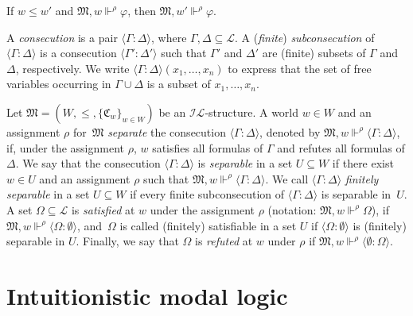 \documentclass[submission,copyright,creativecommons]{eptcs}
\newcommand{\mo}{\mathfrak}
\renewcommand{\phi}{\varphi}
\newcommand{\IL}{\mathscr{I\!\!L}}   %
\newcommand{\LL}{\mathcal{L}}        %
\newcommand{\consec}[2]{\langle #1:#2 \rangle}
\newcommand{\satisfySym}{\Vdash}
\newcommand{\satisfy}[4]{#1, #2 \satisfySym^{#4} #3}
\begin{document}
\begin{lemma}\label{mon.ifol}
  If $w \leq w'$ and $\satisfy{\mo{M}}{w}{\phi}{\rho}$, then $\satisfy{\mo{M}}{w'}{\phi}{\rho}$.
\end{lemma}

\begin{definition}
  A \emph{consecution} is a pair $\consec{\Gamma}{\Delta}$, where $\Gamma,\Delta\subseteq \LL$.
  A (\emph{finite}) \emph{subconsecution} of $\consec{\Gamma}{\Delta}$
  is a consecution $\consec{\Gamma'}{\Delta'}$ such that $\Gamma'$ and $\Delta'$
  are (finite) subsets of $\Gamma$ and $\Delta$, respectively. We write $\consec{\Gamma}{\Delta}(x_1,\ldots,x_n)$ to express that the set of free variables occurring in $\Gamma\cup \Delta$ is a subset of $x_1,\ldots,x_n$.
\end{definition}

\begin{definition}\label{def:separation-refutation}
  Let $\mo{M} = (W, \leq, \{ \mo{C}_w \}_{w \in W})$ be an $\IL$-structure.
 A world $w\in W$ and an assignment $\rho$ for~$\mo{M}$ \emph{separate} the consecution $\consec{\Gamma}{\Delta}$,
  denoted by $\satisfy{\mo{M}}{w}{\consec{\Gamma}{\Delta}}{\rho}$,
  if, under the assignment $\rho$, $w$ satisfies all formulas of $\Gamma$ and refutes all formulas of $\Delta$.
%
  We say that the consecution $\consec{\Gamma}{\Delta}$ is \emph{separable}
  in a set $U \subseteq W$ if there exist $w \in U$ and an assignment
  $\rho$ such that $\satisfy{\mo{M}}{w}{\consec{\Gamma}{\Delta}}{\rho}$.
  We call $\consec{\Gamma}{\Delta}$
  \emph{finitely separable} in a set $U \subseteq W$ if every finite
  subconsecution of $\consec{\Gamma}{\Delta}$ is separable in~$U$.
%
  A set $\Omega \subseteq \LL$ is \emph{satisfied} at $w$ under the assignment $\rho$ (notation: $\satisfy{\mo{M}}{w}{\Omega}{\rho}$), if $\satisfy{\mo{M}}{w}{\consec{\Omega}{\emptyset}}{\rho}$, and~$\Omega$ is called (finitely) satisfiable in a set $U$ if
  $\consec{\Omega}{\emptyset}$ is (finitely) separable in $U$.
  Finally, we say that $\Omega$ is \emph{refuted} at $w$ under $\rho$ if $\satisfy{\mo{M}}{w}{\consec{\emptyset}{\Omega}}{\rho}$.
\end{definition}



\section{Intuitionistic modal logic}\label{sec:ik}
\end{document}

